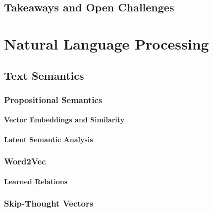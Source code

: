 	\section{Takeaways and Open Challenges} %

\chapter{Natural Language Processing} %

	\section{Text Semantics} %

		\subsection{Propositional Semantics} %

			\subsubsection{Vector Embeddings and Similarity} %

			\subsubsection{Latent Semantic Analysis} %

		\subsection{Word2Vec} %

			\subsubsection{Learned Relations} %

		\subsection{Skip-Thought Vectors} %

